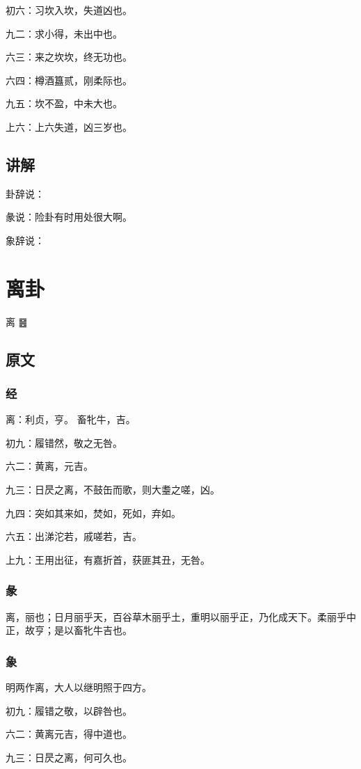 \documentclass[12pt,oneside]{book}
\begin{document}
初六：习坎入坎，失道凶也。

九二：求小得，未出中也。

六三：来之坎坎，终无功也。

六四：樽酒簋贰，刚柔际也。

九五：坎不盈，中未大也。

上六：上六失道，凶三岁也。

\section{讲解}
卦辞说：

彖说：险卦有时用处很大啊。

象辞说：

\chapter{离卦}
离 {\Large ䷝}

\section{原文}


\subsection{经}
离：利贞，亨。 畜牝牛，吉。

初九：履错然，敬之无咎。

六二：黄离，元吉。

九三：日昃之离，不鼓缶而歌，则大耋之嗟，凶。

九四：突如其来如，焚如，死如，弃如。

六五：出涕沱若，戚嗟若，吉。

上九：王用出征，有嘉折首，获匪其丑，无咎。

\subsection{彖}
离，丽也；日月丽乎天，百谷草木丽乎土，重明以丽乎正，乃化成天下。柔丽乎中正，故亨；是以畜牝牛吉也。

\subsection{象}
明两作离，大人以继明照于四方。

初九：履错之敬，以辟咎也。

六二：黄离元吉，得中道也。

九三：日昃之离，何可久也。
\end{document}
